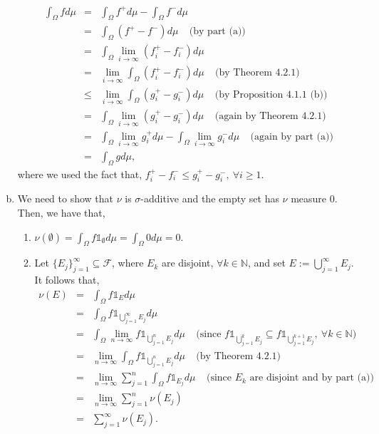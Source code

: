 \documentclass{article}
\begin{document}
\begin{enumerate}[(a)]
\begin{eqnarray}
	\int_\Omega f d\mu &=& \int_\Omega f^+ d\mu - \int_\Omega f^- d\mu\\
	\nonumber
	&=& \int_\Omega (f^+ - f^-) d\mu \ \ \ \ \ \text{(by part (a))}\\
	\nonumber
	&=& \int_\Omega\lim_{i\to\infty} (f_i^+ - f_i^-)d\mu\\
	\nonumber
	&=& \lim_{i\to\infty}\int_\Omega (f_i^+ - f_i^-)d\mu \ \ \ \ \ \text{(by Theorem 4.2.1)}\\
	\nonumber
	&\leq& \lim_{i\to\infty}\int_\Omega (g_i^+ - g_i^-)d\mu \ \ \ \ \ \text{(by Proposition 4.1.1 (b))}\\
	\nonumber
	&=& \int_\Omega\lim_{i\to\infty} (g_i^+ - g_i^-)d\mu \ \ \ \ \ \text{(again by Theorem 4.2.1)}\\
	\nonumber
	&=& \int_\Omega\lim_{i\to\infty} g_i^+ d\mu - \int_\Omega\lim_{i\to\infty} g_i^- d\mu \ \ \ \ \ \text{(again by part (a))}\\
	\nonumber
	&=& \int_\Omega g d\mu,
	\end{eqnarray}
	where we used the fact that, $f_i^+ - f_i^- \leq g_i^+ - g_i^-, \ \forall i \geq 1$.
	\item We need to show that $\nu$ is $\sigma$-additive and the empty set has $\nu$ measure $0$. Then, we have that,
	\begin{enumerate}[1.]
		\item $\nu(\emptyset) = \int_\Omega f \mathds{1}_\emptyset d\mu = \int_\Omega 0 d\mu = 0$.
		\item Let $\{E_j\}_{j=1}^{\infty} \subseteq \mathcal{F}$, where $E_k$ are disjoint, $\forall k \in \mathbb{N}$, and set $E := \bigcup_{j=1}^{\infty}E_j$. It follows that,
		\begin{eqnarray}
		\nonumber
		\nu(E) &=& \int_\Omega f \mathds{1}_E d\mu\\
		\nonumber
		&=& \int_\Omega f \mathds{1}_{\bigcup_{j=1}^{\infty}E_j} d\mu\\
		\nonumber
		&=& \int_\Omega \lim_{n\to\infty} f\mathds{1}_{\bigcup_{j=1}^{n}E_j} d\mu \ \ \ \ \ \text{(since $f\mathds{1}_{\bigcup_{j=1}^{k}E_j} \subseteq f\mathds{1}_{\bigcup_{j=1}^{k+1}E_j}, \ \forall k \in \mathbb{N}$)}\\
		\nonumber
		&=& \lim_{n\to\infty}\int_\Omega f\mathds{1}_{\bigcup_{j=1}^{n}E_j} d\mu \ \ \ \ \ \text{(by Theorem 4.2.1)}\\
		\nonumber
		&=& \lim_{n\to\infty}\sum_{j=1}^{n}\int_\Omega f\mathds{1}_{E_j}  d\mu \ \ \ \ \ \text{(since $E_k$ are disjoint and by part (a))}\\
		\nonumber
		&=& \lim_{n\to\infty}\sum_{j=1}^{n} \nu(E_j)\\
		\nonumber
		&=& \sum_{j=1}^{\infty}\nu(E_j).
		\end{eqnarray}
	\end{enumerate}
\end{enumerate}
\end{document}
